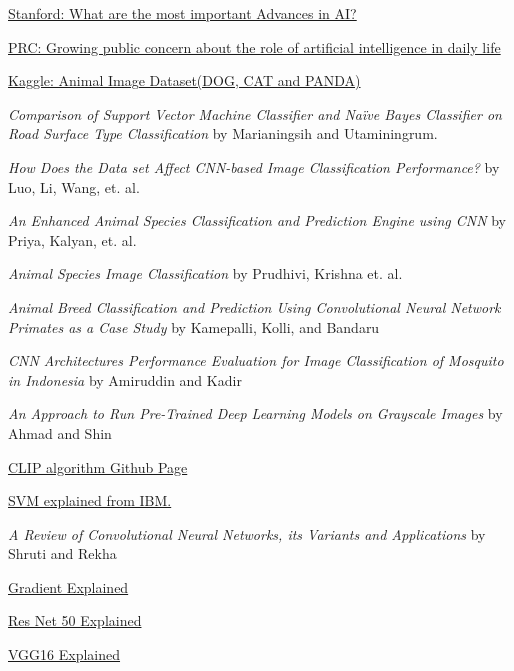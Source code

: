 \documentclass[a4paper,10pt]{article}
\begin{document}
  \begin{thebibliography}{}

     \href{https://ai100.stanford.edu/gathering-strength-gathering-storms-one-hundred-year-study-artificial-intelligence-ai100-2021-1/sq2#:~:text=In%20the%20last%20five%20years,and%20integration%20of%20vision%20and}{Stanford: What are the most important Advances in AI?}

     \href{https://www.pewresearch.org/short-reads/2023/08/28/growing-public-concern-about-the-role-of-artificial-intelligence-in-daily-life/}{PRC: Growing public concern about the role of artificial intelligence in daily life}
  
     \href{https://www.kaggle.com/datasets/ashishsaxena2209/animal-image-datasetdog-cat-and-panda}{Kaggle: Animal Image Dataset(DOG, CAT and PANDA)}

     \emph{Comparison of Support Vector Machine Classifier and Naïve Bayes Classifier on Road Surface Type Classification} by Marianingsih and Utaminingrum.

     \emph{How Does the Data set Affect CNN-based Image Classification Performance?} by Luo, Li, Wang, et. al.

     \emph{An Enhanced Animal Species Classification and Prediction Engine using CNN} by Priya, Kalyan, et. al.
  
     \emph{Animal Species Image Classification} by Prudhivi, Krishna et. al.

     \emph{Animal Breed Classification and Prediction Using Convolutional Neural Network Primates as a Case Study} by Kamepalli, Kolli, and Bandaru

     \emph{CNN Architectures Performance Evaluation for Image Classification of Mosquito in Indonesia} by Amiruddin and Kadir
    
     \emph{An Approach to Run Pre-Trained Deep Learning Models on Grayscale Images} by Ahmad and Shin

     \href{https://github.com/openai/CLIP/tree/main}{CLIP algorithm Github Page}

     \href{https://www.ibm.com/docs/en/spss-modeler/saas?topic=models-how-svm-works}{SVM explained from IBM.}
    
     \emph{A Review of Convolutional Neural Networks, its Variants and Applications} by Shruti and Rekha

     \href{https://machinelearningmastery.com/gradient-in-machine-learning/}{Gradient Explained}

     \href{https://viso.ai/deep-learning/resnet-residual-neural-network/}{Res Net 50 Explained}
    
     \href{https://www.kaggle.com/code/blurredmachine/vggnet-16-architecture-a-complete-guide}{VGG16 Explained}

    

  \end{thebibliography}
\end{document}
